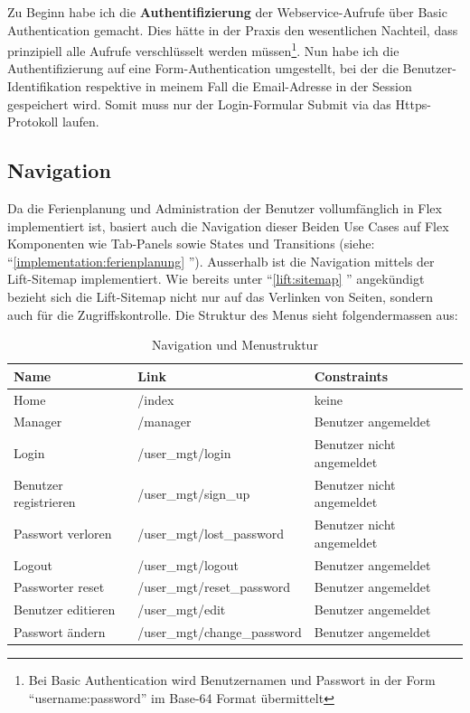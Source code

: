 Zu Beginn habe ich die \textbf{Authentifizierung} der Webservice-Aufrufe \"uber Basic Authentication gemacht. Dies h\"atte in der Praxis den wesentlichen Nachteil, dass prinzipiell alle Aufrufe verschl\"usselt werden m\"ussen\footnote{Bei Basic Authentication wird Benutzernamen und Passwort in der Form ``username:password'' im Base-64 Format \"ubermittelt}.
Nun habe ich die Authentifizierung auf eine Form-Authentication umgestellt, bei der die Benutzer-Identifikation respektive in meinem Fall die Email-Adresse in der Session gespeichert wird. Somit muss nur der Login-Formular Submit via das Https-Protokoll laufen.

\subsection{Navigation}
Da die Ferienplanung und Administration der Benutzer vollumf\"anglich in Flex implementiert ist, basiert auch die Navigation dieser Beiden Use Cases auf Flex Komponenten wie Tab-Panels sowie States und Transitions (siehe: ``\ref{implementation:ferienplanung} '').  Ausserhalb ist die Navigation mittels der Lift-Sitemap implementiert. Wie bereits unter ``\ref{lift:sitemap} '' angek\"undigt bezieht sich die Lift-Sitemap nicht nur auf das Verlinken von Seiten, sondern auch f\"ur die Zugriffskontrolle. Die Struktur des Menus sieht folgendermassen aus:

\begin{spacing}{0.5}
  \begin{longtable}{|p{2cm}|p{5cm}|p{6cm}|}
      \caption{Navigation und Menustruktur}\\
\hline
  \textbf{Name} & \textbf{Link} & \textbf{Constraints}\\
  \hline
  Home & /index & keine\\
  \hline
  Manager & /manager & Benutzer angemeldet\\
  \hline
  Login & /user\_mgt/login & Benutzer nicht angemeldet\\
  \hline
  Benutzer registrieren & /user\_mgt/sign\_up & Benutzer nicht angemeldet\\
  \hline
  Passwort verloren & /user\_mgt/lost\_password & Benutzer nicht angemeldet\\
  \hline
  Logout & /user\_mgt/logout & Benutzer angemeldet\\
  \hline
 Passworter reset & /user\_mgt/reset\_password & Benutzer angemeldet\\
  \hline
  Benutzer editieren & /user\_mgt/edit & Benutzer angemeldet\\
  \hline
  Passwort \"andern & /user\_mgt/change\_password & Benutzer angemeldet\\
  \hline
  \end{longtable}
\end{spacing}

